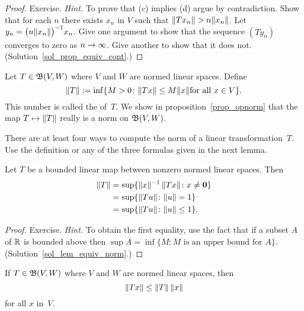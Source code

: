 \begin{proof}  Exercise. \emph{Hint.}  To prove that (c) implies (d) argue by contradiction.
Show that for each $n$ there exists $x_n$ in $V$ such that $\lVert Tx_n\rVert > n\lVert x_n\rVert$.  Let
$y_n = \bigl(n\lVert x_n\rVert\bigr)^{-1}x_n$.  Give one argument to show that the sequence $(Ty_n)$
converges to zero as $n \rightarrow\infty$.  Give another to show that it does not.
(Solution~\ref{sol_prop_equiv_cont}.)  \ns
\end{proof}

\begin{defn} Let $T \in \mathfrak{B}(V,W)$ where $V$ and $W$ are normed linear spaces.  Define
  \[ \lVert T\rVert := \inf\{M > 0\colon \lVert Tx\rVert \le M \lVert x\rVert \text{for all $x \in V$}\}. \]
This number is called the
 of~$T$.  We show in proposition~\ref{prop_opnorm} that the map $T \mapsto \lVert T\rVert$
really is a norm on $\mathfrak{B}(V,W)$.
\end{defn}

There are at least four ways to compute the norm of a linear transformation~$T$.  Use the
definition or any of the three formulas given in the next lemma.

\begin{lem}\label{lem_equiv_norm} Let $T$ be a bounded linear map between nonzero normed linear
spaces. Then
  \begin{align*}
     \lVert T\rVert &= \sup\{\lVert x\rVert^{-1}\,\lVert Tx\rVert \colon x \ne \mathbf{0}\} \\
             &= \sup\{\lVert Tu\rVert \colon \lVert u\rVert = 1\} \\
             &= \sup\{\lVert Tu\rVert \colon \lVert u\rVert \le 1\}.
  \end{align*}
\end{lem}

\begin{proof} Exercise. \emph{Hint.}  To obtain the first equality, use the fact that if a subset
$A$ of $\mathbb{R}$ is bounded above then $\sup A = \inf\{M \colon \text{$M$ is an upper bound
for~$A$}\}$.  (Solution~\ref{sol_lem_equiv_norm}.)  \ns
\end{proof}

\begin{cor}\label{cor_norm_op} If $T \in \mathfrak{B}(V,W)$ where $V$ and $W$ are normed linear spaces, then
  \[ \lVert Tx\rVert \le \lVert T\rVert \, \lVert x\rVert \]
for all $x$ in~$V$.
\end{cor}

